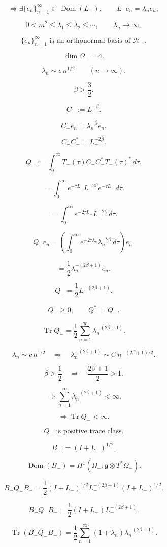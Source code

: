 \documentclass[11pt]{article}
\begin{document}
\[
\Longrightarrow
\exists
\{e_n\}_{n=1}^{\infty}
\subset\operatorname{Dom}(L_-),
\qquad
L_-e_n=\lambda_ne_n,
\]

\[
0<m^2\le \lambda_1\le\lambda_2\le\cdots,
\qquad
\lambda_n\to\infty,
\]

\[
\{e_n\}_{n=1}^{\infty}
\text{ is an orthonormal basis of }\mathcal H_-.
\]

\[
\dim\Omega_-=4.
\]

\[
\lambda_n\sim c\,n^{1/2}
\qquad
(n\to\infty).
\]

\[
\beta>\frac32.
\]

\[
C_-:=L_-^{-\beta}.
\]

\[
C_-e_n=\lambda_n^{-\beta}e_n.
\]

\[
C_-C_-^\ast=L_-^{-2\beta}.
\]

\[
Q_-
:=
\int_0^\infty
T_-(\tau)C_-C_-^\ast T_-(\tau)^\ast\,d\tau.
\]

\[
=
\int_0^\infty
e^{-\tau L_-}L_-^{-2\beta}e^{-\tau L_-}\,d\tau.
\]

\[
=
\int_0^\infty
e^{-2\tau L_-}L_-^{-2\beta}\,d\tau.
\]

\[
Q_-e_n
=
\left(
\int_0^\infty
e^{-2\tau\lambda_n}\lambda_n^{-2\beta}\,d\tau
\right)e_n.
\]

\[
=
\frac12\lambda_n^{-(2\beta+1)}e_n.
\]

\[
Q_-=\frac12L_-^{-(2\beta+1)}.
\]

\[
Q_-\ge0,
\qquad
Q_-^\ast=Q_-.
\]

\[
\operatorname{Tr}Q_-
=
\frac12
\sum_{n=1}^{\infty}
\lambda_n^{-(2\beta+1)}.
\]

\[
\lambda_n\sim c\,n^{1/2}
\quad\Longrightarrow\quad
\lambda_n^{-(2\beta+1)}
\sim
C\,n^{-(2\beta+1)/2}.
\]

\[
\beta>\frac12
\quad\Longrightarrow\quad
\frac{2\beta+1}{2}>1.
\]

\[
\Longrightarrow
\sum_{n=1}^{\infty}
\lambda_n^{-(2\beta+1)}<\infty.
\]

\[
\Longrightarrow
\operatorname{Tr}Q_-<\infty.
\]

\[
Q_-
\text{ is positive trace class}.
\]

\[
B_-:=(I+L_-)^{1/2}.
\]

\[
\operatorname{Dom}(B_-)
=
H^1(\Omega_-;\mathfrak g\otimes T^\ast\Omega_-).
\]

\[
B_-Q_-B_-
=
\frac12
(I+L_-)^{1/2}
L_-^{-(2\beta+1)}
(I+L_-)^{1/2}.
\]

\[
B_-Q_-B_-
=
\frac12
(I+L_-)L_-^{-(2\beta+1)}.
\]

\[
\operatorname{Tr}(B_-Q_-B_-)
=
\frac12
\sum_{n=1}^{\infty}
(1+\lambda_n)\lambda_n^{-(2\beta+1)}.
\]
\end{document}
